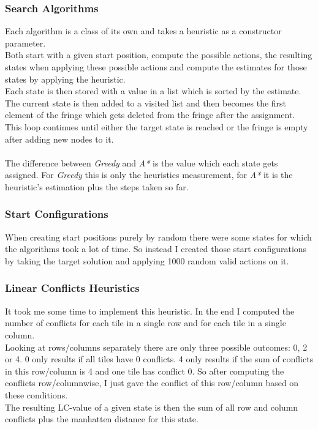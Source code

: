 \documentclass[paper=a4, fontsize=11pt]{scrartcl} %
\numberwithin{equation}{section} %
\numberwithin{figure}{section} %
\numberwithin{table}{section} %
\begin{document}
\subsubsection{Search Algorithms}
Each algorithm is a class of its own and takes a heuristic as a constructor parameter.\\
Both start with a given start position, compute the possible actions, the resulting states when applying these possible actions and compute the estimates for those states by applying the heuristic.\\
Each state is then stored with a value in a list which is sorted by the estimate.\\
The current state is then added to a visited list and then becomes the first element of the fringe which gets deleted from the fringe after the assignment.\\
This loop continues until either the target state is reached or the fringe is empty after adding new nodes to it.\\\\
The difference between \emph{Greedy} and \emph{A*} is the value which each state gets assigned. For \emph{Greedy} this is only the heuristics measurement, for \emph{A*} it is the heuristic's estimation plus the steps taken so far.

\subsubsection{Start Configurations}
When creating start positions purely by random there were some states for which the algorithms took a lot of time. So instead I created those start configurations by taking the target solution and applying 1000 random valid actions on it.

\subsubsection{Linear Conflicts Heuristics}
It took me some time to implement this heuristic. In the end I computed the number of conflicts for each tile in a single row and for each tile in a single column.\\
Looking at rows/columns separately there are only three possible outcomes: 0, 2 or 4. 0 only results if all tiles have 0 conflicts. 4 only results if the sum of conflicts in this row/column is 4 and one tile has conflict 0. So after computing the conflicts row/columnwise, I just gave the conflict of this row/column based on these conditions.\\
The resulting LC-value of a given state is then the sum of all row and column conflicts plus the manhatten distance for this state.
\end{document}
